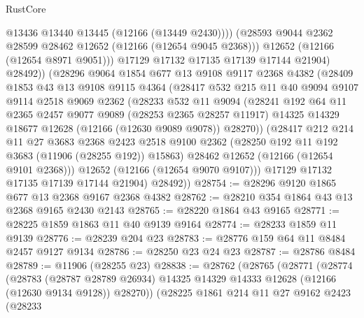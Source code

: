 \begin{lexlean}{RustCore}
\begin{coremodule}
                  @13436
                  @13440
                  @13445
                  (@12166 (@13449 @2430))))
              (@28593 @9044 @2362 @28599 @28462 @12652 (@12166 (@12654 @9045 @2368)))
              @12652
              (@12166 (@12654 @8971 @9051)))
            @17129
            @17132
            @17135
            @17139
            @17144
            @21904)
          @28492))
      (@28296
        @9064
        @1854
        @677
        @13
        @9108
        @9117
        @2368
        @4382
        (@28409
          @1853
          @43
          @13
          @9108
          @9115
          @4364
          (@28417
            @532
            @215
            @11
            @40
            @9094
            @9107
            @9114
            @2518
            @9069
            @2362
            (@28233
              @532
              @11
              @9094
              (@28241
                @192
                @64
                @11
                @2365
                @2457
                @9077
                @9089
                (@28253 @2365 @28257 @11917)
                @14325
                @14329
                @18677
                @12628
                (@12166 (@12630 @9089 @9078))
                @28270))
            (@28417
              @212
              @214
              @11
              @27
              @3683
              @2368
              @2423
              @2518
              @9100
              @2362
              (@28250 @192 @11 @192 @3683 (@11906 (@28255 @192)) @15863)
              @28462
              @12652
              (@12166 (@12654 @9101 @2368)))
            @12652
            (@12166 (@12654 @9070 @9107)))
          @17129
          @17132
          @17135
          @17139
          @17144
          @21904)
        @28492))
@28754 := @28296 @9120 @1865 @677 @13 @2368 @9167 @2368 @4382
@28762 := @28210 @354 @1864 @43 @13 @2368 @9165 @2430 @2143
@28765 := @28220 @1864 @43 @9165
@28771 := @28225 @1859 @1863 @11 @40 @9139 @9164
@28774 := @28233 @1859 @11 @9139
@28776 := @28239 @204 @23
@28783 := @28776 @159 @64 @11 @8484 @2457 @9127 @9134
@28786 := @28250 @23 @24 @23
@28787 := @28786 @8484
@28789 := @11906 (@28255 @23)
@28838 := @28762
    (@28765
      (@28771
        (@28774
          (@28783
            (@28787 @28789 @26934)
            @14325
            @14329
            @14333
            @12628
            (@12166 (@12630 @9134 @9128))
            @28270))
        (@28225
          @1861
          @214
          @11
          @27
          @9162
          @2423
          (@28233

\end{coremodule}
\end{lexlean}
